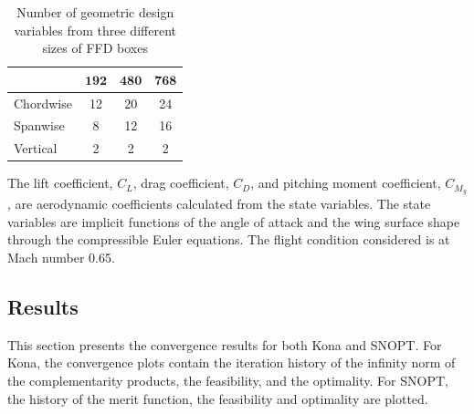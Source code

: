 \begin{table}[tbp]
  \begin{center}
    \caption{Number of geometric design variables from three different sizes of FFD boxes
    \label{tab:ffd_sizes}}
  \begin{tabular}{ l   c c c}
          & $\mathbf{192}$  & $\mathbf{480}$   &  $\mathbf{768}$   \\
    \hline
    Chordwise  &    12    & 20  & 24 \\ 
    Spanwise &    8   & 12 & 16 \\  
    Vertical  &    2  & 2   & 2
  \end{tabular}
  \end{center}
\end{table}

 

The lift coefficient, $C_L$, drag coefficient, $C_D$, and pitching moment coefficient, $C_{M_y}$, are aerodynamic coefficients calculated from the state variables. The state variables are implicit functions of the angle of attack and the wing surface shape through the compressible Euler equations.  The flight condition considered is at Mach number 0.65. 


\subsection{Results}
This section presents the convergence results for both Kona and SNOPT. For Kona, the convergence plots contain 
the iteration history of the infinity norm of the complementarity products, the feasibility, and the optimality. For SNOPT, 
the history of the merit function, the feasibility and optimality are plotted. 

